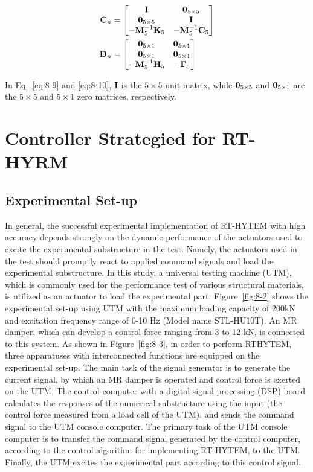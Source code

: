 \begin{equation}\label{eq:8-10}
\begin{aligned}
\mathbf{C}_{n} & = \begin{bmatrix} \mathbf{I} & \mathbf{0}_{5\times5} \\ \mathbf{0}_{5\times5} & \mathbf{I} \\ -\mathbf{M}_{5}^{-1}\mathbf{K}_{5} & -\mathbf{M}_{5}^{-1}\mathbf{C}_{5}\end{bmatrix} \\
\mathbf{D}_{n} & = \begin{bmatrix} \mathbf{0}_{5\times1} & \mathbf{0}_{5\times1} \\ \mathbf{0}_{5\times1} & \mathbf{0}_{5\times1} \\ -\mathbf{M}_{5}^{-1}\mathbf{H}_{5} & -\mathbf{\Gamma}_{5} \end{bmatrix}
\end{aligned}
\end{equation}

In Eq.~\eqref{eq:8-9} and \eqref{eq:8-10}, $\mathbf{I}$ is the $5\times5$ unit matrix, while $\mathbf{0}_{5\times5}$ and $\mathbf{0}_{5\times1}$ are the $5\times5$ and $5\times1$ zero matrices, respectively.

\section{Controller Strategied for RT-HYRM}
\subsection{Experimental Set-up}
In general, the successful experimental implementation of RT-HYTEM with high accuracy depends strongly on the dynamic performance of the actuators used to excite the experimental substructure in the test. Namely, the actuators used in the test should promptly react to applied command signals and load the experimental substructure. In this study, a universal testing machine (UTM), which is commonly used for the performance test of various structural materials, is utilized as an actuator to load the experimental part. Figure~\ref{fig:8-2} shows the experimental set-up using UTM with the maximum loading capacity of 200kN and excitation frequency range of 0-10 Hz (Model name STL-HU10T). An MR damper, which can develop a control force ranging from 3 to 12 kN, is connected to this system. As shown in Figure~\ref{fig:8-3}, in order to perform RTHYTEM, three apparatuses with interconnected functions are equipped on the experimental set-up. The main task of the signal generator is to generate the current signal, by which an MR damper is operated and control force is exerted on the UTM. The control computer with a digital signal processing (DSP) board calculates the responses of the numerical substructure using the input (the control force measured from a load cell of the UTM), and sends the command signal to the UTM console computer. The primary task of the UTM console computer is to transfer the command signal generated by the control computer, according to the control algorithm for implementing RT-HYTEM, to the UTM. Finally, the UTM excites the experimental part according to this control signal.

